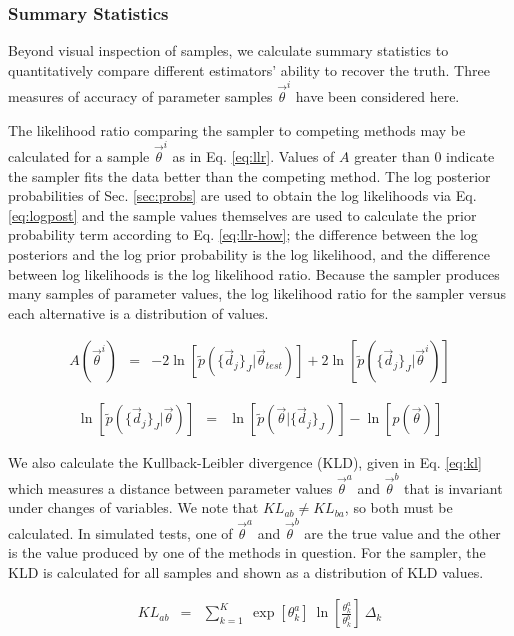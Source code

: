 \documentclass[preprint]{aastex}
\begin{document}
\clearpage
\subsubsection{Summary Statistics}
\label{sec:stats}

Beyond visual inspection of samples, we calculate summary statistics to quantitatively compare different estimators' ability to recover the truth.  Three measures of accuracy of parameter samples $\vec{\theta}^{i}$  have been considered here.  

The likelihood ratio comparing the sampler to competing methods may be calculated for a sample $\vec{\theta}^{i}$ as in Eq. \ref{eq:llr}.  Values of $A$ greater than 0 indicate the sampler fits the data better than the competing method.  The log posterior probabilities of Sec. \ref{sec:probs} are used to obtain the log likelihoods via Eq. \ref{eq:logpost} and the sample values themselves are used to calculate the prior probability term according to Eq. \ref{eq:llr-how}; the difference between the log posteriors and the log prior probability is the log likelihood, and the difference between log likelihoods is the log likelihood ratio.  Because the sampler produces many samples of parameter values, the log likelihood ratio for the sampler versus each alternative is a distribution of values.

\begin{eqnarray}
\label{eq:llr}
A(\vec{\theta}^{i}) &=& -2\ln[\tilde{p}(\{\vec{d}_{j}\}_{J}|\vec{\theta}_{test})]+2\ln[\tilde{p}(\{\vec{d}_{j}\}_{J}|\vec{\theta}^{i})]
\end{eqnarray}

\begin{eqnarray}
\label{eq:llr-how}
\ln[\tilde{p}(\{\vec{d}_{j}\}_{J}|\vec{\theta})] &=& \ln[\tilde{p}(\vec{\theta}|\{\vec{d}_{j}\}_{J})]-\ln[p(\vec{\theta})]
\end{eqnarray}

We also calculate the Kullback-Leibler divergence (KLD), given in Eq. \ref{eq:kl} which measures a distance between parameter values $\vec{\theta}^{a}$ and $\vec{\theta}^{b}$ that is invariant under changes of variables.  We note that $KL_{ab}\neq KL_{ba}$, so both must be calculated.  In simulated tests, one of $\vec{\theta}^{a}$ and $\vec{\theta}^{b}$ are the true value and the other is the value produced by one of the methods in question.  For the sampler, the KLD is calculated for all samples and shown as a distribution of KLD values.

\begin{eqnarray}
\label{eq:kl}
KL_{ab} &=& \sum_{k=1}^{K}\ \exp[\theta_{k}^{a}]\ \ln\left[\frac{\theta_{k}^{a}}{\theta_{k}^{b}}\right]\ \Delta_{k}
\end{eqnarray}
\end{document}
